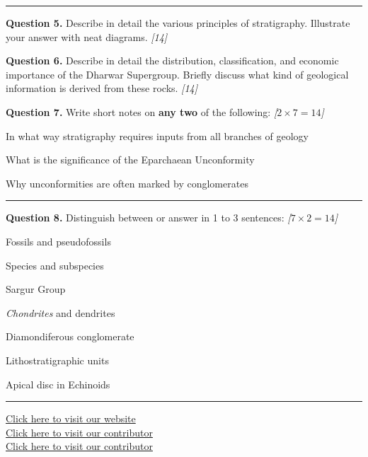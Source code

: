 \documentclass[11pt,a4paper]{article}
\newcommand{\pts}[1]{\hfill   \textit{[#1]}}
\begin{document}
\bigskip


\rule{\linewidth}{0.4pt}\smallskip




\noindent   \textbf{Question 5.} Describe in detail the various principles of stratigraphy. Illustrate your answer with neat diagrams. \pts{14}

\medskip


\noindent   \textbf{Question 6.} Describe in detail the distribution, classification, and economic importance of the Dharwar Supergroup. Briefly discuss what kind of geological information is derived from these rocks. \pts{14}

\medskip


\noindent   \textbf{Question 7.} Write short notes on   \textbf{any two} of the following: \pts{$2  \times 7 = 14$}

\begin{parts}
  \item In what way stratigraphy requires inputs from all branches of geology
  \item What is the significance of the Eparchaean Unconformity
  \item Why unconformities are often marked by conglomerates
\end{parts}

\bigskip


\rule{\linewidth}{0.4pt}\smallskip




\noindent   \textbf{Question 8.} Distinguish between or answer in 1 to 3 sentences: \pts{$7  \times 2 = 14$}

\begin{romanparts}
  \item Fossils and pseudofossils
  \item Species and subspecies
  \item Sargur Group
  \item \emph{Chondrites} and dendrites
  \item Diamondiferous conglomerate
  \item Lithostratigraphic units
  \item Apical disc in Echinoids
\end{romanparts}

\vfill\rule{\linewidth}{0.4pt}

\begin{center}\small
\href{https://bhu-exam.vercel.app/}{Click here to visit our website}\\[4pt]
\href{https://me-aryan.vercel.app/}{Click here to visit our contributor}\\[4pt]
\href{https://quashan-me.vercel.app/}{Click here to visit our contributor}
\end{center}
\end{document}
